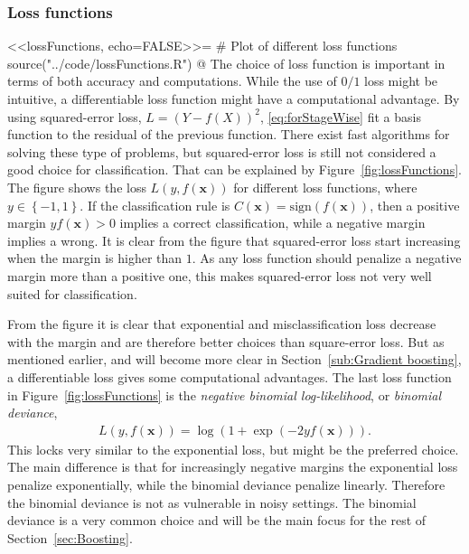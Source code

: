 \subsubsection{Loss functions}
\label{sub:Loss functions}
<<lossFunctions, echo=FALSE>>=
# Plot of different loss functions
source("../code/lossFunctions.R")
@
The choice of loss function is important in terms of both accuracy and computations. While the use of $0/1$ loss might be intuitive, a differentiable loss function might have a computational advantage. By using squared-error loss, $L = (Y - f(X))^2$, \eqref{eq:forStageWise} fit a basis function to the residual of the previous function. There exist fast algorithms for solving these type of problems, but squared-error loss is still not considered a good choice for classification. That can be explained by Figure~\ref{fig:lossFunctions}. The figure shows the loss $L(y, f(\mathbf{x}))$ for different loss functions, where $y \in \left\{ -1, 1 \right\}$. If the classification rule is $C(\mathbf{x}) = \mathrm{sign}(f(\mathbf{x}))$, then a positive margin $y f(\mathbf{x}) > 0$ implies a correct classification, while a negative margin implies a wrong. It is clear from the figure that squared-error loss start increasing when the margin is higher than $1$. As any loss function should penalize a negative margin more than a positive one, this makes squared-error loss not very well suited for classification.

From the figure it is clear that exponential and misclassification loss decrease with the margin and are therefore better choices than square-error loss. But as mentioned earlier, and will become more clear in Section~\ref{sub:Gradient boosting}, a differentiable loss gives some computational advantages. The last loss function in Figure~\ref{fig:lossFunctions} is the \textit{negative binomial log-likelihood}, or \textit{binomial deviance},
\begin{align}
  L(y, f(\mathbf{x})) = \log \left( 1 + \exp (-2 y f(\mathbf{x})) \right).
\end{align}
This locks very similar to the exponential loss, but might be the preferred choice. The main difference is that for increasingly negative margins the exponential loss penalize exponentially, while the binomial deviance penalize linearly. Therefore the binomial deviance is not as vulnerable in noisy settings. The binomial deviance is a very common choice and will be the main focus for the rest of Section~\ref{sec:Boosting}. 

